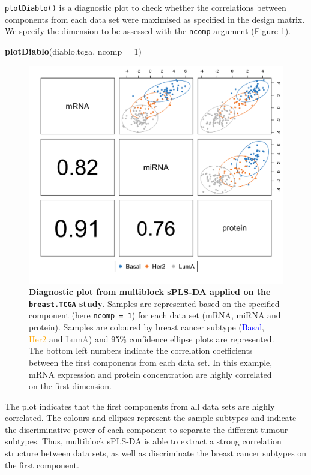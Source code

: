\documentclass[]{book}
\newenvironment{Shaded}{\begin{snugshade}}{\end{snugshade}}
\newcommand{\DataTypeTok}[1]{\textcolor[rgb]{0.13,0.29,0.53}{#1}}
\newcommand{\DecValTok}[1]{\textcolor[rgb]{0.00,0.00,0.81}{#1}}
\newcommand{\KeywordTok}[1]{\textcolor[rgb]{0.13,0.29,0.53}{\textbf{#1}}}
\newcommand{\NormalTok}[1]{#1}
\begin{document}
\texttt{plotDiablo()} is a diagnostic plot to check whether the correlations between components from each data set were maximised as specified in the design matrix. We specify the dimension to be assessed with the \texttt{ncomp} argument (Figure \ref{fig:plot-diablo}).

\begin{Shaded}
\begin{Highlighting}[]
\KeywordTok{plotDiablo}\NormalTok{(diablo.tcga, }\DataTypeTok{ncomp =} \DecValTok{1}\NormalTok{)}
\end{Highlighting}
\end{Shaded}

\begin{figure}

{\centering \includegraphics[width=0.5\linewidth]{Figures/DIABLO/plot-diablo-1} 

}

\caption{\textbf{Diagnostic plot from multiblock sPLS-DA applied on the \texttt{breast.TCGA} study.} Samples are represented based on the specified component (here \texttt{ncomp\ =\ 1}) for each data set (mRNA, miRNA and protein). Samples are coloured by breast cancer subtype (\textcolor{blue}{Basal}, \textcolor{orange}{Her2} and \textcolor{grey}{LumA}) and 95\% confidence ellipse plots are represented. The bottom left numbers indicate the correlation coefficients between the first components from each data set. In this example, mRNA expression and protein concentration are highly correlated on the first dimension.}\label{fig:plot-diablo}
\end{figure}



The plot indicates that the first components from all data sets are highly correlated. The colours and ellipses represent the sample subtypes and indicate the discriminative power of each component to separate the different tumour subtypes. Thus, multiblock sPLS-DA is able to extract a strong correlation structure between data sets, as well as discriminate the breast cancer subtypes on the first component.
\end{document}

